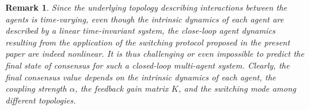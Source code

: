\documentclass[letterpaper, 10 pt, conference]{ieeeconf}
\newtheorem{remark}{Remark}
\begin{document}
\begin{remark}\label{RemarkOnFinalConsensusValue}
Since the underlying topology describing
  interactions between the agents is time-varying,
even though the intrinsic dynamics of each
agent are described by a linear time-invariant system, the close-loop agent
dynamics resulting from the application of
  the switching protocol proposed
in the present paper are indeed nonlinear. It is thus challenging or even
impossible to predict the final
state of consensus for such
a closed-loop multi-agent system. Clearly, the final consensus value depends on the intrinsic dynamics of each agent, the coupling strength $\alpha$, the feedback gain matrix $K$, and the switching mode among different topologies.
\end{remark}
\end{document}
